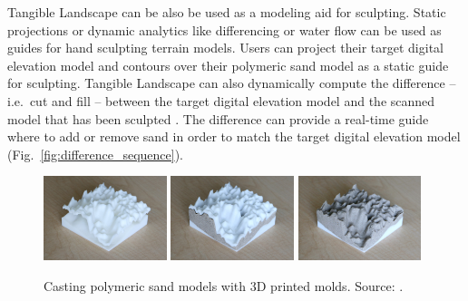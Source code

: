 \documentclass[prodmode,acmtochi]{acmsmall} %
\begin{document}
Tangible Landscape can be also be used as a modeling aid for sculpting.
Static projections or dynamic analytics like differencing or water flow 
can be used as guides for hand sculpting terrain models. 
Users can project their target digital elevation model and contours 
over their polymeric sand model as a static guide for sculpting. 
Tangible Landscape can also dynamically compute the difference -- i.e.\ cut and fill --
between the target digital elevation model and the scanned model that has been sculpted . 
The difference can provide a real-time guide 
where to add or remove sand in order to match the target digital elevation model (Fig.~\ref{fig:difference_sequence}). 

\begin{figure}
\begin{center}
		\includegraphics[width=0.32\textwidth]{images/3d_print/3d_print_1.jpg}
		\includegraphics[width=0.32\textwidth]{images/3d_print/3d_print_2.jpg}
		\includegraphics[width=0.32\textwidth]{images/3d_print/3d_print_3.jpg}
	\caption{Casting polymeric sand models with 3D printed molds. Source: \cite{Petrasova2015}.}
	\label{fig:casting}
\end{center}
\end{figure}
\end{document}
